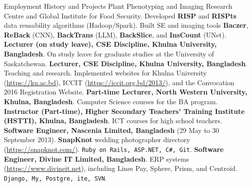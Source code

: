 \begin{rubric}{Employment History and Projects}
	Plant Phenotyping and Imaging Research Centre and Global Institute for Food Security.
	Developed \textbf{RISP} and \textbf{RISPts} data reusability algorithms (Hadoop/Spark).
	Built SE and imaging tools \textbf{Baczer}, \textbf{ReBack} (CNN), \textbf{BackTrans} (LLM), \textbf{BackSlice}, and \textbf{InsCount} (UNet).
\vspace{-1mm}
\entry*[2017/24]%
	\textbf{Lecturer (on study leave), CSE Discipline, Khulna University, Bangladesh}.
	On study leave for graduate studies at the University of Saskatchewan.
\vspace{-1mm}
\entry*[2013/17]%
	\textbf{Lecturer, CSE Discipline, Khulna University, Bangladesh}.
	Teaching and research. Implemented websites for Khulna University (\url{https://ku.ac.bd}), ICCIT (\url{https://iccit.org.bd/2013/}), and the Convocation 2016 Registration Website.
\vspace{-1mm}
\entry*[2014/16]%
	\textbf{Part-time Lecturer, North Western University, Khulna, Bangladesh}.
	Computer Science courses for the {BA} program.
\vspace{-1mm}
\entry*[2014/16]%
	\textbf{Instructor (Part-time), Higher Secondary Teachers' Training Institute ({HSTTI}), Khulna, Bangladesh}.
	ICT courses for high school teachers.
\vspace{-1mm}
\entry*[2013]%
	\textbf{Software Engineer, Nascenia Limited, Bangladesh} (29 May to 30 September 2013).
	\textbf{SnapKnot} wedding photographer directory (\url{https://snapknot.com/}). \texttt{Ruby on Rails, ASP.NET, C\#, Git}.
\vspace{-1mm}
\entry*[2012/13]%
	\textbf{Software Engineer, Divine IT Limited, Bangladesh}.
	ERP systems (\url{https://www.divineit.net}), including Lines Pay, Sphere, Prism, and Centroid. \texttt{Django, My, Postgre, ite, SVN}.
\end{rubric}
